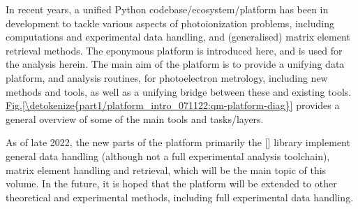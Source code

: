 \documentclass[letterpaper,10pt,english]{jupyterBook}
\begin{document}
\sphinxAtStartPar
In recent years, a unified Python codebase/ecosystem/platform has been in development to tackle various aspects of photoionization problems, including  computations and experimental data handling, and (generalised) matrix element retrieval methods. The eponymous  platform is introduced here, and is used for the analysis herein. The main aim of the platform is to provide a unifying data platform, and analysis routines, for photoelectron metrology, including new methods and tools, as well as a unifying bridge between these and existing tools. \hyperref[\detokenize{part1/platform_intro_071122:qm-platform-diag}]{Fig.\@ \ref{\detokenize{part1/platform_intro_071122:qm-platform-diag}}} provides a general overview of some of the main tools and tasks/layers.

\sphinxAtStartPar
As of late 2022, the new parts of the platform \sphinxhyphen{} primarily the  {[}{]} library \sphinxhyphen{} implement general data handling (although not a full experimental analysis toolchain), matrix element handling and retrieval, which will be the main topic of this volume.
In the future, it is hoped that the platform will be extended to other theoretical and experimental methods, including full experimental data handling.
\end{document}

